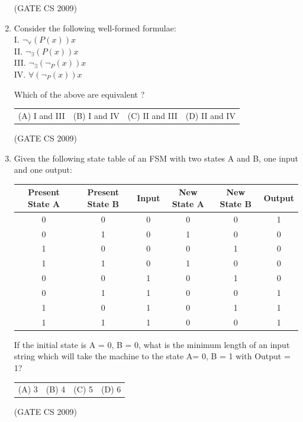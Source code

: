 \documentclass[a4paper, 11pt]{article}
\begin{document}
\begin{enumerate}
    \hfill (GATE CS 2009)

    \item Consider the following well-formed formulae:\\
    I. $\neg_ \forall (P(x))x$\\
    II. $\neg_ \exists (P(x))x$\\
    III. $\neg_ \exists (\neg_ P(x))x$\\
    IV. $\forall (\neg_ P(x))x$

    Which of the above are equivalent ?\\
    \begin{tabularx}{\textwidth}{@{}XXXX@{}}
    (A) I and III & (B) I and IV & (C) II and III & (D) II and IV
    \end{tabularx}

    \hfill (GATE CS 2009)

    \item Given the following state table of an FSM with two states A and B, one input and one output:\\
    \begin{tabular}{|c|c|c|c|c|c|}
    \hline
        Present State A  & Present State B  & Input & New State A & New State B & Output\\
        \hline
        0  & 0  & 0 & 0 & 0 & 1\\
        \hline
        0  & 1  & 0 & 1 & 0 & 0\\
        \hline
        1  & 0  & 0 & 0 & 1 & 0\\
        \hline
        1  & 1  & 0 & 1 & 0 & 0\\
        \hline
        0  & 0  & 1 & 0 & 1 & 0\\
        \hline
        0  & 1  & 1 & 0 & 0 & 1\\
        \hline
        1  & 0  & 1 & 0 & 1 & 1\\
        \hline
        1  & 1  & 1 & 0 & 0 & 1\\
        \hline
    \end{tabular}

        If the initial state is A = 0, B = 0, what is the minimum length of an input string which will take the machine to the state A= 0, B = 1 with Output = 1?\\
        \begin{tabularx}{\textwidth}{@{}XXXX@{}}
        (A) 3 & (B) 4 & (C) 5 & (D) 6
        \end{tabularx}

        \hfill (GATE CS 2009)


\end{enumerate}
\end{document}
